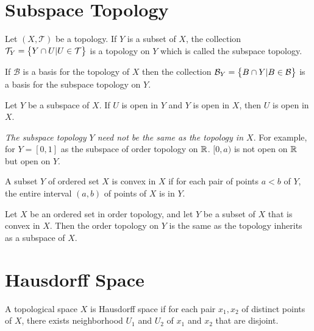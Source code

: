 \section{Subspace Topology}

\begin{definition}
    Let $(X, \mathcal{T})$ be a topology. If $Y$ is a subset of $X$, the collection $\mathcal{T}_{Y} = \set{Y \cap U | U \in \mathcal{T}}$ is a topology on $Y$ which is called the subspace topology.
\end{definition}

\begin{theorem}
    If $\mathcal{B}$ is a basis for the topology of $X$ then the collection $\mathcal{B}_Y = \set{B \cap Y | B \in \mathcal{B}}$ is a basis for the subspace topology on $Y$.
\end{theorem}

\begin{theorem}
    Let $Y$ be a subspace of $X$. If $U$ is open in $Y$ and $Y$ is open in $X$, then $U$ is open in $X$.    
\end{theorem}

\emph{The subspace topology $Y$ need not be the same as the topology in $X$}. For example, for $Y=[0,1]$ as the subspace of order topology on $\mathbb{R}$. $[0,a)$ is not open on $\mathbb{R}$ but open on $Y$.


\begin{theorem}
    A subset $Y$ of ordered set $X$ is convex in $X$ if for each pair of points $a < b$ of $Y$, the entire interval $(a,b)$ of points of $X$ is in $Y$.     
\end{theorem}

\begin{theorem}\label{convex_order_topology_are_the_same}
    Let $X$ be an ordered set in order topology, and let $Y$ be a subset of $X$ that is convex in $X$. Then the order topology on $Y$ is the same as the topology inherits as a subspace of $X$.    
\end{theorem}






\section{Hausdorff Space}

\begin{definition}
    A topological space $X$ is Hausdorff space if for each pair $x_1, x_2$ of distinct points of $X$, there exists neighborhood $U_1$ and $U_2$ of $x_1$ and $x_2$ that are disjoint.
\end{definition}

